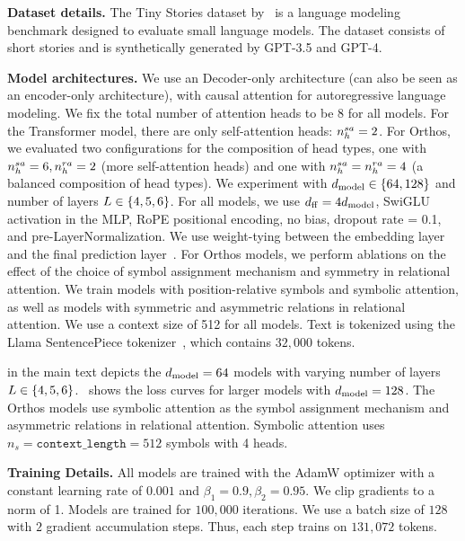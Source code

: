 
\textbf{Dataset details.} The Tiny Stories dataset by~\citet{eldanTinyStoriesHowSmall2023} is a language modeling benchmark designed to evaluate small language models. The dataset consists of short stories and is synthetically generated by GPT-3.5 and GPT-4.

\textbf{Model architectures.} We use an Decoder-only architecture (can also be seen as an encoder-only architecture), with causal attention for autoregressive language modeling. We fix the total number of attention heads to be $8$ for all models. For the Transformer model, there are only self-attention heads: $n_h^{sa} = 2$. For Orthos, we evaluated two configurations for the composition of head types, one with $n_h^{sa} = 6, n_h^{ra} = 2$ (more self-attention heads) and one with $n_h^{sa} = n_h^{ra} = 4$ (a balanced composition of head types). We experiment with $d_{\mathrm{model}} \in \{64, 128\}$ and number of layers $L \in \{4, 5, 6\}$. For all models, we use $d_{\mathrm{ff}} = 4 d_{\mathrm{model}}$, SwiGLU activation in the MLP, RoPE positional encoding, no bias, dropout rate = 0.1, and pre-LayerNormalization. We use weight-tying between the embedding layer and the final prediction layer~\citep{inanTyingWordVectors2016}. For Orthos models, we perform ablations on the effect of the choice of symbol assignment mechanism and symmetry in relational attention. We train models with position-relative symbols and symbolic attention, as well as models with symmetric and asymmetric relations in relational attention. We use a context size of 512 for all models. Text is tokenized using the Llama SentencePiece tokenizer~\citep{touvronLlamaOpenFoundation2023}, which contains $32,000$ tokens.

 in the main text depicts the $d_{\mathrm{model}} = 64$ models with varying number of layers $L \in \{4, 5, 6\}$.~ shows the loss curves for larger models with $d_{\mathrm{model}} = 128$. The Orthos models use symbolic attention as the symbol assignment mechanism and asymmetric relations in relational attention. Symbolic attention uses $n_s = \texttt{context\_length} = 512$ symbols with 4 heads.

\textbf{Training Details.} All models are trained with the AdamW optimizer with a constant learning rate of $0.001$ and $\beta_1 = 0.9, \beta_2 = 0.95$. We clip gradients to a norm of 1. Models are trained for $100,000$ iterations. We use a batch size of $128$ with $2$ gradient accumulation steps. Thus, each step trains on $131,072$ tokens.


